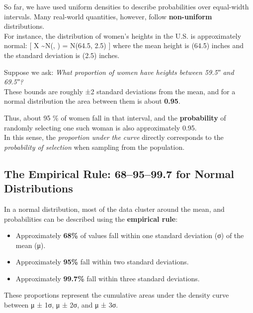 \documentclass[
  letterpaper,
  DIV=11,
  numbers=noendperiod]{scrreprt}
\providecommand{\tightlist}{%
  \setlength{\itemsep}{0pt}\setlength{\parskip}{0pt}}
\begin{document}
So far, we have used uniform densities to describe probabilities over
equal-width intervals. Many real-world quantities, however, follow
\textbf{non-uniform} distributions.\\
For instance, the distribution of women's heights in the U.S. is
approximately normal: {[} X \sim N(\mu, \sigma) = N(64.5, 2.5) {]} where
the mean height is (64.5) inches and the standard deviation is (2.5)
inches.

Suppose we ask: \emph{What proportion of women have heights between
59.5″ and 69.5″?}\\
These bounds are roughly ±2 standard deviations from the mean, and for a
normal distribution the area between them is about \textbf{0.95}.

Thus, about 95 \% of women fall in that interval, and the
\textbf{probability} of randomly selecting one such woman is also
approximately 0.95.\\
In this sense, the \emph{proportion under the curve} directly
corresponds to the \emph{probability of selection} when sampling from
the population.

\subsection{The Empirical Rule: 68--95--99.7 for Normal
Distributions}\label{the-empirical-rule-689599.7-for-normal-distributions}

In a normal distribution, most of the data cluster around the mean, and
probabilities can be described using the \textbf{empirical rule}:

\begin{itemize}
\tightlist
\item
  Approximately \textbf{68\%} of values fall within one standard
  deviation (σ) of the mean (μ).\\
\item
  Approximately \textbf{95\%} fall within two standard deviations.\\
\item
  Approximately \textbf{99.7\%} fall within three standard deviations.
\end{itemize}

These proportions represent the cumulative areas under the density curve
between μ ± 1σ, μ ± 2σ, and μ ± 3σ.
\end{document}
